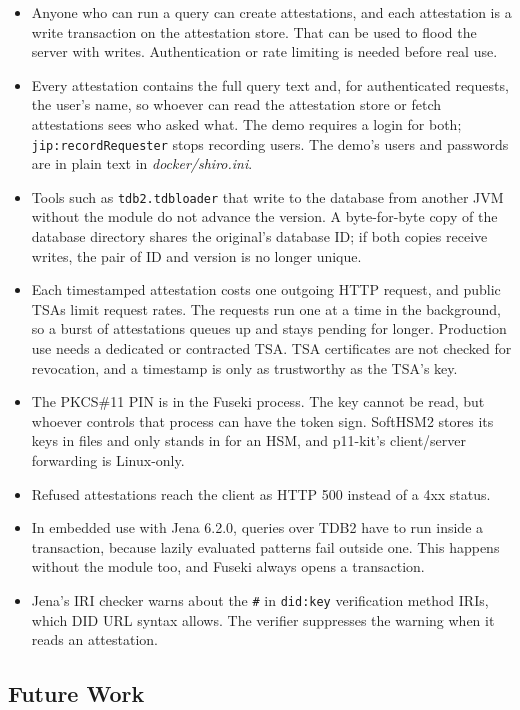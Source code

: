 \documentclass[11pt,a4paper]{article}
\newcommand{\code}[1]{\texttt{#1}}
\newcommand{\file}[1]{\textit{#1}}
\begin{document}
\begin{itemize}
\item Anyone who can run a query can create attestations, and each attestation is a write
  transaction on the attestation store. That can be used to flood the server with writes. Authentication or rate limiting is needed before real use.
\item Every attestation contains the full query text and, for authenticated requests, the
  user's name, so whoever can read the attestation store or fetch attestations sees who asked
  what. The demo requires a login for both; \code{jip:recordRequester} stops recording users.
  The demo's users and passwords are in plain text in \file{docker/shiro.ini}.
\item Tools such as \code{tdb2.tdbloader} that write to the database from another JVM
  without the module do not advance the version. A byte-for-byte copy of the database
  directory shares the original's database ID; if both copies receive writes, the pair of ID
  and version is no longer unique.
\item Each timestamped attestation costs one outgoing HTTP request, and public TSAs limit
  request rates. The requests run one at a time in the background, so a burst of attestations
  queues up and stays pending for longer. Production use needs a dedicated or contracted TSA.
  TSA certificates are not checked for revocation, and a timestamp is only as trustworthy as
  the TSA's key.
\item The PKCS\#11 PIN is in the Fuseki process. The key cannot be read, but whoever controls
  that process can have the token sign. SoftHSM2 stores its keys in files and only stands in
  for an HSM, and p11-kit's client/server forwarding is Linux-only.
\item Refused attestations reach the client as HTTP 500 instead of a 4xx status.
\item In embedded use with Jena 6.2.0, queries over TDB2 have to run inside a transaction,
  because lazily evaluated patterns fail outside one. This happens without the module too,
  and Fuseki always opens a transaction.
\item Jena's IRI checker warns about the \code{\#} in \code{did:key} verification method
  IRIs, which DID URL syntax allows. The verifier suppresses the warning when it reads an
  attestation.
\end{itemize}

\subsection{Future Work}
\label{sec:future}
\end{document}
